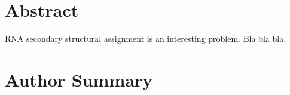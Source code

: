 \documentclass[10pt,letterpaper]{article}
\begin{document}
\section*{Abstract}
RNA secondary structural assignment is an interesting problem. Bla bla bla.



\section*{Author Summary}
\end{document}
